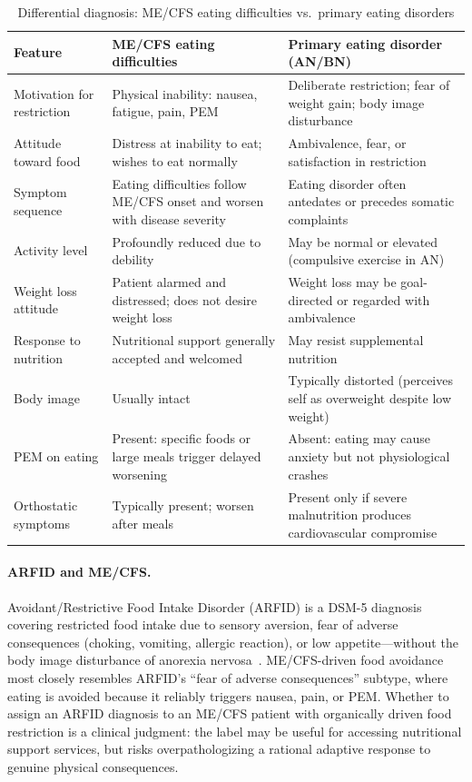\begin{table}[ht]
\centering
\small
\caption{Differential diagnosis: ME/CFS eating difficulties vs.\ primary eating disorders}
\label{tab:ed-mecfs-differential}
\begin{tabular}{p{3.5cm} p{4.5cm} p{4.5cm}}
\toprule
\textbf{Feature} & \textbf{ME/CFS eating difficulties} & \textbf{Primary eating disorder (AN/BN)} \\
\midrule
Motivation for restriction & Physical inability: nausea, fatigue, pain, PEM & Deliberate restriction; fear of weight gain; body image disturbance \\[4pt]
Attitude toward food & Distress at inability to eat; wishes to eat normally & Ambivalence, fear, or satisfaction in restriction \\[4pt]
Symptom sequence & Eating difficulties follow ME/CFS onset and worsen with disease severity & Eating disorder often antedates or precedes somatic complaints \\[4pt]
Activity level & Profoundly reduced due to debility & May be normal or elevated (compulsive exercise in AN) \\[4pt]
Weight loss attitude & Patient alarmed and distressed; does not desire weight loss & Weight loss may be goal-directed or regarded with ambivalence \\[4pt]
Response to nutrition & Nutritional support generally accepted and welcomed & May resist supplemental nutrition \\[4pt]
Body image & Usually intact & Typically distorted (perceives self as overweight despite low weight) \\[4pt]
PEM on eating & Present: specific foods or large meals trigger delayed worsening & Absent: eating may cause anxiety but not physiological crashes \\[4pt]
Orthostatic symptoms & Typically present; worsen after meals & Present only if severe malnutrition produces cardiovascular compromise \\
\bottomrule
\end{tabular}
\end{table}

\paragraph{ARFID and ME/CFS.}
Avoidant/Restrictive Food Intake Disorder (ARFID) is a DSM-5 diagnosis covering restricted food intake due to sensory aversion, fear of adverse consequences (choking, vomiting, allergic reaction), or low appetite---without the body image disturbance of anorexia nervosa~\cite{Fisher2014arfid}. ME/CFS-driven food avoidance most closely resembles ARFID's ``fear of adverse consequences'' subtype, where eating is avoided because it reliably triggers nausea, pain, or PEM. Whether to assign an ARFID diagnosis to an ME/CFS patient with organically driven food restriction is a clinical judgment: the label may be useful for accessing nutritional support services, but risks overpathologizing a rational adaptive response to genuine physical consequences.

